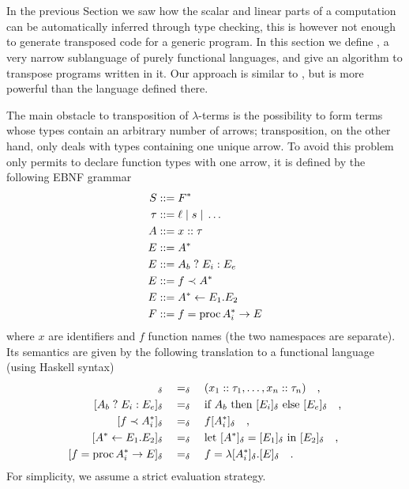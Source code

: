 \section{\tAL}
\label{sec:transAL}

In the previous Section we saw how the scalar and linear parts of a
computation can be automatically inferred through type checking, this
is however not enough to generate transposed code for a generic
program. In this section we define \tAL{}, a very narrow sublanguage
of purely functional languages, and give an algorithm to transpose
programs written in it. Our approach is similar to \cite{BoLeSc03},
but \tAL{} is more powerful than the language defined there.

The main obstacle to transposition of $\lambda$-terms is the
possibility to form terms whose types contain an arbitrary number of
arrows; transposition, on the other hand, only deals with types
containing one unique arrow. To avoid this problem \tAL{} only permits
to declare function types with one arrow, it is defined by the
following EBNF grammar
\begin{align}
  S &::= F^\ast\\
  \tau &::= \ell \;|\; s \;|\; \ldots\\
  A &::= x::\tau\\
  \label{eq:tAL-exp}
  E &::= A^\ast\\
  \label{eq:tAL-if}
  E &::= A_b \;?\; E_i : E_e\\
  \label{eq:tAL-apply}
  E &::= f \prec A^\ast\\
  \label{eq:tAL-let}
  E &::= A^\ast\leftarrow E_1.E_2\\
  \label{eq:tAL-fun}
  F &::= f = \operatorname{proc} A_i^\ast \rightarrow E
\end{align}
where $x$ are identifiers and $f$ function names (the two namespaces
are separate). Its semantics are given by the following translation to
a functional language (using Haskell syntax)
\begin{align}
  [x_1::\tau_1\cdots x_n::\tau_n]_\delta &\quad=_\delta\quad (x_1::\tau_1,\ldots,x_n::\tau_n)
  \quad\text{,}\\
  [A_b \;?\; E_i : E_e]_\delta &\quad=_\delta\quad
  \text{if }A_b\text{ then }[E_i]_\delta\text{ else }[E_e]_\delta
  \quad\text{,}\\
  [f \al A_i^\ast]_\delta &\quad=_\delta\quad
  f [A_i^\ast]_\delta \quad\text{,}\\
  [A^\ast\la E_1.E_2]_\delta &\quad=_\delta\quad
  \text{let } [A^\ast]_\delta = [E_1]_\delta \text{ in } [E_2]_\delta
  \quad\text{,}\\
  [f = \proc A_i^\ast \ra E]_\delta &\quad=_\delta\quad
  f = \lambda [A_i^\ast]_\delta.[E]_\delta\quad\text{.}
\end{align}
For simplicity, we assume a strict evaluation strategy.

